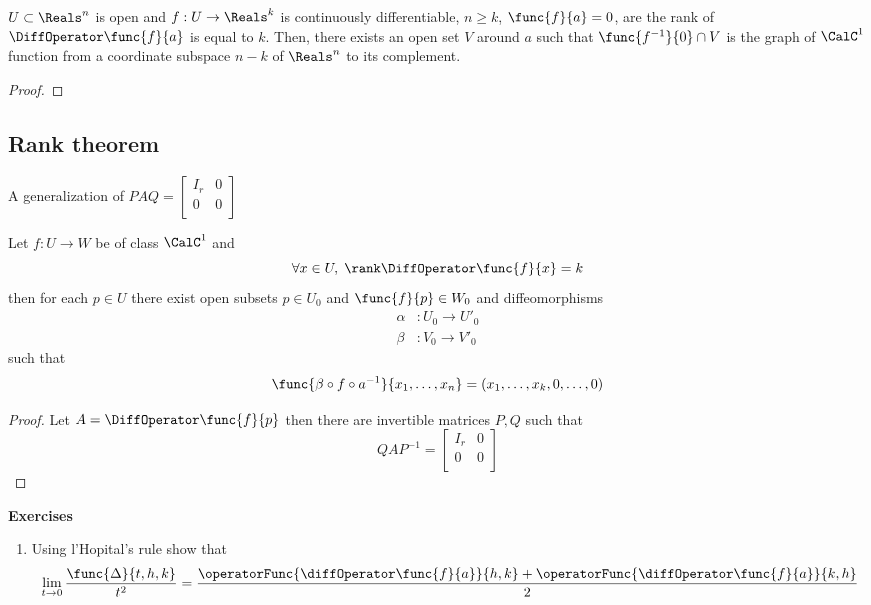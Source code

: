 \begin{corollary}
    \(U \subset \Reals^n\) is open and \(f : U \to \Reals^k\) is continuously differentiable, \(n \geq k\), \(\func{f}{a} = 0\), are the rank of \(\DiffOperator \func{f}{a}\) is equal to \(k\). Then, there exists an open set \(V\) around \(a\) such that \(\func{f^{-1}}{0} \cap V\) is the graph of \(\CalC^1\) function from a coordinate subspace \(n - k\) of \(\Reals^n\) to its complement.
\end{corollary}

\begin{proof}

\end{proof}



\subsection{Rank theorem}
A generalization of \(PAQ = \begin{bmatrix}
    I_r & 0 \\
    0   & 0 \\
\end{bmatrix}\)
\begin{theorem}
    Let \(f: U \to W\) be of class \(\CalC^1\) and
    \begin{equation*}
        \forall x \in U, \; \rank \DiffOperator \func{f}{x} = k
    \end{equation*}
    then for each \(p \in U\) there exist open subsets \(p \in U_0\) and \(\func{f}{p} \in W_0\) and diffeomorphisms
    \begin{align*}
        \alpha & : U_0 \to U'_0 \\
        \beta  & : V_0 \to V'_0
    \end{align*}
    such that
    \begin{equation*}
        \func{ \beta \circ f \circ a^{-1} }{x_1, \dots, x_n} = (x_1, \dots , x_k, 0 , \dots, 0)
    \end{equation*}
\end{theorem}

\begin{proof}
    Let \(A = \DiffOperator \func{f}{p}\) then there are invertible matrices \(P,Q\) such that
    \begin{equation*}
        Q A P^{-1} = \begin{bmatrix}
            I_r & 0 \\
            0   & 0 \\
        \end{bmatrix}
    \end{equation*}
\end{proof}

{\Large\textbf{Exercises}}
\begin{enumerate}
    \item Using l'Hopital's rule show that
          \begin{equation*}
              \lim_{t \to 0} \dfrac{\func{\Delta}{t,h,k}}{t^2} = \dfrac{\operatorFunc{\diffOperator \func{f}{a}}{h,k} + \operatorFunc{\diffOperator \func{f}{a}}{k,h}}{2}
          \end{equation*}
\end{enumerate}
\newpage
